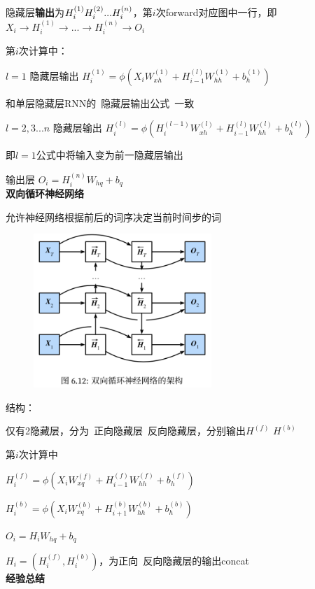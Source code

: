 \documentclass[UTF8]{ctexart}
\begin{document}
  \quad 隐藏层\textbf{输出}为$H_i^{(1)} \space H_i^{(2)}...H_i^{(n)}$，第$i$次forward对应图中一行，即$X_i \rightarrow  H_i^{(1)} \rightarrow  ... \rightarrow  H_i^{(n)} \rightarrow O_i$

  \quad 第$i$次计算中：

  \quad \quad $l = 1$ 隐藏层输出 $H_i^{(1)} = \phi (X_iW_{xh}^{(1)} + H_{i-1}^{(l)}W_{hh}^{(1)} + b_h^{(1)})$

  \quad \quad \quad 和单层隐藏层RNN的\ 隐藏层输出公式\ 一致

  \quad \quad $l = 2,3...n$ 隐藏层输出 $H_i^{(l)} = \phi (H_i^{(l-1)}W_{xh}^{(l)} + H_{i-1}^{(l)}W_{hh}^{(l)} + b_h^{(l)})$

  \quad \quad \quad 即$l=1$公式中将输入变为前一隐藏层输出

  \quad \quad 输出层 $O_i = H_{i}^{(n)}W_{hq} + b_q$\\
\textbf{双向循环神经网络}

  允许神经网络根据前后的词序决定当前时间步的词
  \begin{figure}[H] %
    \centering %
    \includegraphics[width=0.6\textwidth]{note_images/double_deep_RNN.png} %
  \end{figure}
  结构：

  \quad 仅有2隐藏层，分为\ 正向隐藏层\ 反向隐藏层，分别输出$H^{(f)}$ $H^{(b)}$

  \quad 第$i$次计算中

  \quad \quad $H_i^{(f)} = \phi (X_iW_{xq}^{(f)} + H_{i-1}^{(f)}W_{hh}^{(f)} + b_h^{(f)})$

  \quad \quad $H_i^{(b)} = \phi (X_iW_{xq}^{(b)} + H_{i+1}^{(b)}W_{hh}^{(b)} + b_h^{(b)})$

  \quad \quad $O_i = H_iW_{hq} + b_q$

  \quad \quad \quad $H_i = (H_i^{(f)}, H_i^{(b)})$，为正向\ 反向隐藏层的输出concat\\
\textbf{经验总结}
\end{document}
